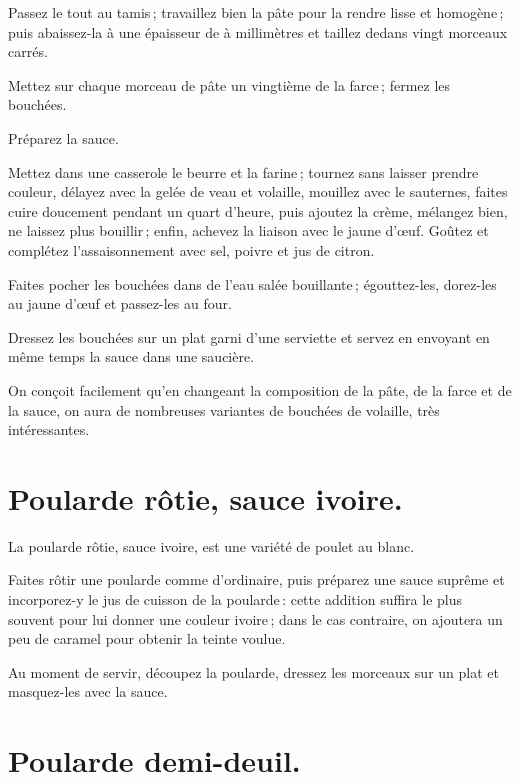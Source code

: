 Passez le tout au tamis ; travaillez bien la pâte pour la rendre lisse et
homogène ; puis abaissez-la à une épaisseur de {\mmm} à {\mmm} millimètres et taillez
dedans vingt morceaux carrés.

Mettez sur chaque morceau de pâte un vingtième de la farce ; fermez les
bouchées.

Préparez la sauce.

Mettez dans une casserole le beurre et la farine ; tournez sans laisser prendre
couleur, délayez avec la gelée de veau et volaille, mouillez avec le sauternes,
faites cuire doucement pendant un quart d'heure, puis ajoutez la crème,
mélangez bien, ne laissez plus bouillir ; enfin, achevez la liaison avec le
jaune d'œuf. Goûtez et complétez l'assaisonnement avec sel, poivre et jus de
citron.

Faites pocher les bouchées dans de l'eau salée bouillante ; égouttez-les,
dorez-les au jaune d'œuf et passez-les au four.

Dressez les bouchées sur un plat garni d'une serviette et servez en envoyant en
même temps la sauce dans une saucière.

\sk

On conçoit facilement qu'en changeant la composition de la pâte, de la farce et
de la sauce, on aura de nombreuses variantes de bouchées de volaille, très
intéressantes.

\section*{\centering Poularde rôtie, sauce ivoire.}
{}

La poularde rôtie, sauce ivoire, est une variété de poulet au blanc.

Faites rôtir une poularde comme d'ordinaire, puis préparez une sauce suprême et
incorporez-y le jus de cuisson de la poularde : cette addition suffira le plus
souvent pour lui donner une couleur ivoire ; dans le cas contraire, on ajoutera
un peu de caramel pour obtenir la teinte voulue.

Au moment de servir, découpez la poularde, dressez les morceaux sur un plat et
masquez-les avec la sauce.

\section*{\centering Poularde demi-deuil.}
{}

